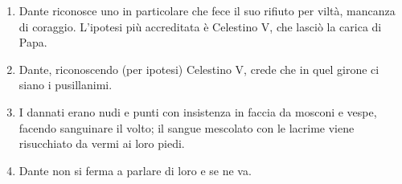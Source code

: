 \documentclass{article}
\begin{document}
\begin{enumerate}
{    e dietro la venìa sì lunga tratta \\ 
    di gente, ch'i' non avrei creduto \\ 
    che morte tanta n'avesse disfatta.
    }
    Dante vede una bandiera seguita da tantissime persone. La colpa dei pusillanimi è non essersi mai schierati; la pena è seguire per sempre il vessillo (simbolo di schieramento).
    \item 
    Dante riconosce uno in particolare che fece il suo rifiuto per viltà, mancanza di coraggio. L'ipotesi più accreditata è Celestino V, che lasciò la carica di Papa.
    \item 
    Dante, riconoscendo (per ipotesi) Celestino V, crede che in quel girone ci siano i pusillanimi.
    \item 
    I dannati erano nudi e punti con insistenza in faccia da mosconi e vespe, facendo sanguinare il volto; il sangue mescolato con le lacrime viene risucchiato da vermi ai loro piedi.
    \item Dante non si ferma a parlare di loro e se ne va.
\end{enumerate}
\end{document}
